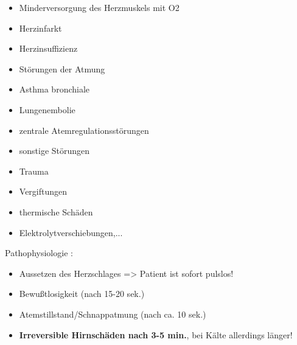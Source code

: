 \documentclass{article}
\newcommand\gEs[1]{\textbf{\textcolor[rgb]{0.0,0.0,0.5019608}{#1}}}
\newcommand\gEs[1]{\textbf{\textcolor[rgb]{0.0,0.0,0.5019608}{#1}}}
\begin{document}
\begin{itemize}
\item {\mdseries
Minderversorgung des Herzmuskels mit O2}

\end{itemize}
\begin{itemize}
\item {\mdseries
Herzinfarkt}

\item {\mdseries
Herzinsuffizienz}

\end{itemize}
\begin{itemize}
\item {\mdseries
St\"orungen der Atmung}

\end{itemize}
\begin{itemize}
\item {\mdseries
Asthma bronchiale}

\item {\mdseries
Lungenembolie}

\item {\mdseries
zentrale Atemregulationsst\"orungen}

\end{itemize}
\begin{itemize}
\item {\mdseries
sonstige St\"orungen}

\end{itemize}
\begin{itemize}
\item {\mdseries
Trauma}

\item {\mdseries
Vergiftungen}

\item {\mdseries
thermische Sch\"aden}

\item {\mdseries
Elektrolytverschiebungen,...}

\end{itemize}
{\mdseries\color{black}
Pathophysiologie :}

\begin{itemize}
\item {\mdseries
Aussetzen des Herzschlages ={\textgreater} Patient ist sofort pulslos!}

\item {\mdseries
Bewu{\ss}tlosigkeit (nach 15-20 sek.)}

\item {\mdseries
Atemstillstand/Schnappatmung (nach ca. 10 sek.)}

\item {\mdseries
\gEs{Irreversible Hirnsch\"aden nach 3-5 min.}, bei
K\"alte allerdings l\"anger!}

\end{itemize}
\end{document}
